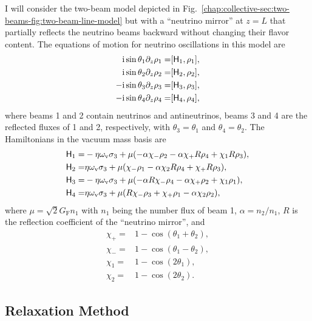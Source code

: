 I will consider the two-beam model depicted in Fig.~\ref{chap:collective-sec:two-beams-fig:two-beam-line-model} but with a ``neutrino mirror'' at $z=L$ that partially reflects the neutrino beams backward without changing their flavor content. The equations of motion for neutrino oscillations in this model are
\begin{align}
    \mathrm{i} \sin\theta_1 \partial_z \rho_1 = & [ \mathsf H_1, \rho_1 ], \\
    \mathrm{i} \sin\theta_2 \partial_z \rho_2 = & [ \mathsf H_2, \rho_2 ], \\
    -\mathrm{i} \sin\theta_3  \partial_z \rho_3 = & [ \mathsf H_3, \rho_3 ], \\
    -\mathrm{i} \sin\theta_4 \partial_z \rho_4 = & [ \mathsf H_4, \rho_4 ],
\end{align}
where beams 1 and 2 contain neutrinos and antineutrinos, beams 3 and 4 are the reflected fluxes of 1 and 2, respectively, with $\theta_3=\theta_1$ and $\theta_4=\theta_2$. The Hamiltonians in the vacuum mass basis are
\begin{align}
    \mathsf H_1 =& -\eta \omega_\mathrm v \sigma_3 + \mu( -\alpha \chi_-  \rho_2 - \alpha \chi_+ R \rho_4 + \chi_1 R  \rho_3), \\
    \mathsf H_2 =& \eta \omega_\mathrm v \sigma_3 + \mu( \chi_- \rho_1 -\alpha \chi_2 R  \rho_4 + \chi_+ R  \rho_3), \\
    \mathsf H_3 =& -\eta \omega_\mathrm v \sigma_3 + \mu( -\alpha R  \chi_-  \rho_4 -\alpha \chi_+ \rho_2 + \chi_1  \rho_1), \\
    \mathsf H_4 =& \eta \omega_\mathrm v \sigma_3 + \mu( R   \chi_- \rho_3 + \chi_+  \rho_1 -\alpha \chi_2  \rho_2),
\end{align}
where $\mu=\sqrt{2}G_{\mathrm F}n_1$ with $n_1$ being the number flux of beam 1, $\alpha=n_2/n_1$, $R$ is the reflection coefficient of the ``neutrino mirror'', and
\begin{align*}
    \chi_+ = & 1 - \cos ( \theta_1 + \theta_2 ), \\
    \chi_- = & 1 - \cos ( \theta_1 - \theta_2 ), \\
    \chi_1 = & 1 - \cos ( 2\theta_1 ), \\
    \chi_2 = & 1 - \cos ( 2\theta_2 ).
\end{align*}




\subsection{\label{chap:halo-sec:num}Relaxation Method}



